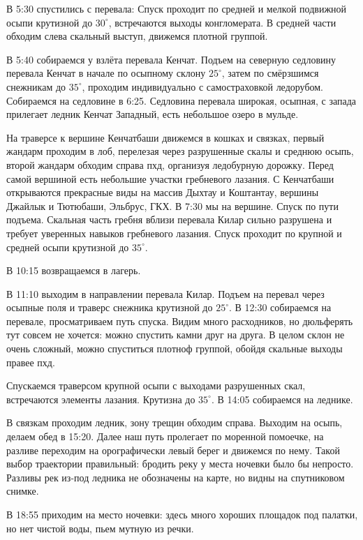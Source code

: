 В 5:30 спустились с перевала: Спуск проходит по средней и мелкой подвижной осыпи крутизной до
$30^\circ$, встречаются выходы конгломерата. В средней части обходим слева скальный выступ, движемся плотной группой.

В 5:40 собираемся у взлёта перевала Кенчат. Подъем на северную седловину перевала Кенчат в начале
по осыпному склону $25^\circ$, затем по смёрзшимся снежникам до $35^\circ$, проходим индивидуально с самостраховкой ледорубом. Собираемся на седловине в 6:25. Седловина перевала широкая, осыпная, с запада прилегает ледник Кенчат Западный, есть небольшое озеро в мульде.

На траверсе к вершине Кенчатбаши движемся в кошках и связках, первый жандарм проходим в
лоб, перелезая через разрушенные скалы и среднюю осыпь, второй жандарм обходим справа
пхд, организуя ледобурную дорожку. Перед самой вершиной есть небольшие участки гребневого
лазания. С Кенчатбаши открываются прекрасные виды на массив Дыхтау и Коштантау, вершины
Джайлык и Тютюбаши, Эльбрус, ГКХ. В 7:30 мы на вершине. Спуск по пути подъема. Скальная
часть гребня вблизи перевала Килар сильно разрушена и требует уверенных навыков гребневого лазания. Спуск проходит по крупной и средней осыпи крутизной до $35^\circ$.

В 10:15 возвращаемся в лагерь.

В 11:10 выходим в направлении перевала Килар. Подъем на перевал через осыпные поля и траверс снежника крутизной до $25^\circ$. В 12:30 собираемся на перевале, просматриваем путь спуска. Видим много расходников, но дюльферять тут совсем не хочется: можно спустить камни друг на друга. В целом склон не очень сложный, можно спуститься плотноф группой, обойдя скальные выходы правее пхд.

Спускаемся траверсом крупной осыпи с выходами разрушенных скал, встречаются элементы лазания. Крутизна до $35^\circ$. В 14:05 собираемся на леднике.

В связкам проходим ледник, зону трещин обходим справа. Выходим на осыпь, делаем обед в 15:20.
Далее наш путь пролегает по моренной помоечке, на разливе переходим на орографически левый берег и движемся по нему. Такой выбор траектории правильный: бродить реку у места ночевки было бы непросто. Разливы рек из-под ледника не обозначены на карте, но видны на спутниковом снимке.

В 18:55 приходим на место ночевки: здесь много хороших площадок под палатки, но нет чистой воды, пьем мутную из речки.



